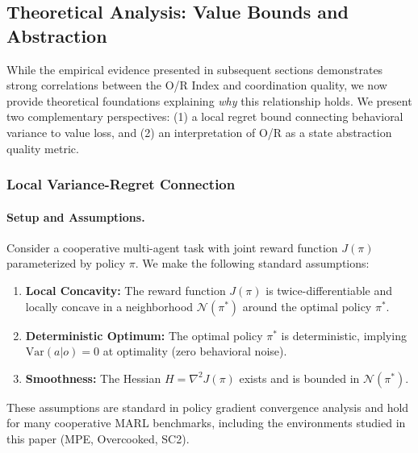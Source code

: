 
\subsection{Theoretical Analysis: Value Bounds and Abstraction}
\label{sec:theoretical_analysis}

While the empirical evidence presented in subsequent sections demonstrates strong correlations between the O/R Index and coordination quality, we now provide theoretical foundations explaining \textit{why} this relationship holds. We present two complementary perspectives: (1) a local regret bound connecting behavioral variance to value loss, and (2) an interpretation of O/R as a state abstraction quality metric.

\subsubsection{Local Variance-Regret Connection}

\paragraph{Setup and Assumptions.}
Consider a cooperative multi-agent task with joint reward function $J(\pi)$ parameterized by policy $\pi$. We make the following standard assumptions:

\begin{enumerate}
\item \textbf{Local Concavity:} The reward function $J(\pi)$ is twice-differentiable and locally concave in a neighborhood $\mathcal{N}(\pi^*)$ around the optimal policy $\pi^*$.
\item \textbf{Deterministic Optimum:} The optimal policy $\pi^*$ is deterministic, implying $\text{Var}(a|o) = 0$ at optimality (zero behavioral noise).
\item \textbf{Smoothness:} The Hessian $H = \nabla^2 J(\pi)$ exists and is bounded in $\mathcal{N}(\pi^*)$.
\end{enumerate}

These assumptions are standard in policy gradient convergence analysis and hold for many cooperative MARL benchmarks, including the environments studied in this paper (MPE, Overcooked, SC2).

